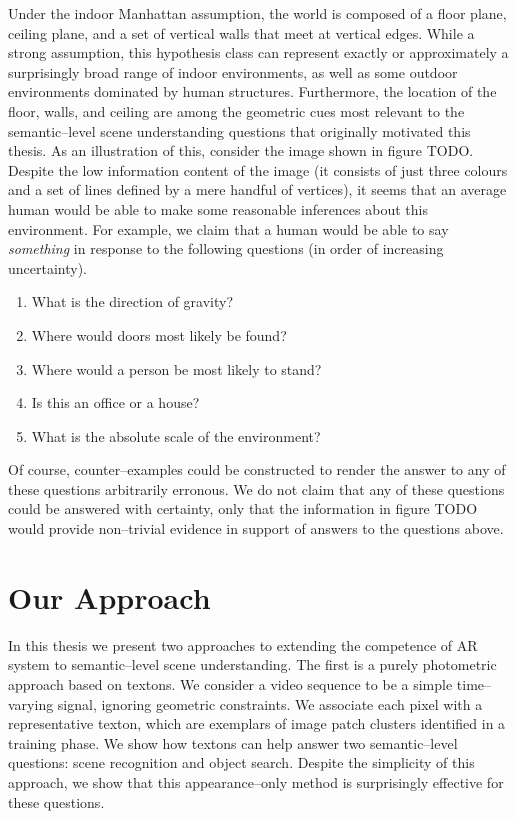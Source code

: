 Under the indoor Manhattan assumption, the world is composed of a
floor plane, ceiling plane, and a set of vertical walls that meet at
vertical edges. While a strong assumption, this hypothesis class can
represent exactly or approximately a surprisingly broad range of
indoor environments, as well as some outdoor environments dominated by
human structures. Furthermore, the location of the floor, walls, and
ceiling are among the geometric cues most relevant to the
semantic--level scene understanding questions that originally
motivated this thesis. As an illustration of this, consider the image
shown in figure TODO. Despite the low information content of the image
(it consists of just three colours and a set of lines defined by a
mere handful of vertices), it seems that an average human would be
able to make some reasonable inferences about this environment. For
example, we claim that a human would be able to say \textit{something}
in response to the following questions (in order of increasing
uncertainty).
\begin{enumerate}
  \item{What is the direction of gravity?}
  \item{Where would doors most likely be found?}
  \item{Where would a person be most likely to stand?}
  \item{Is this an office or a house?}
  \item{What is the absolute scale of the environment?}
\end{enumerate}
Of course, counter--examples could be constructed to render the answer
to any of these questions arbitrarily erronous. We do not claim that
any of these questions could be answered with certainty, only that the
information in figure TODO would provide non--trivial evidence in
support of answers to the questions above.

\section{Our Approach}

In this thesis we present two approaches to extending the competence
of AR system to semantic--level scene understanding. The first is a
purely photometric approach based on textons. We consider a video
sequence to be a simple time--varying signal, ignoring geometric
constraints. We associate each pixel with a representative texton,
which are exemplars of image patch clusters identified in a training
phase. We show how textons can help answer two semantic--level
questions: scene recognition and object search. Despite the simplicity
of this approach, we show that this appearance--only method is
surprisingly effective for these questions.

